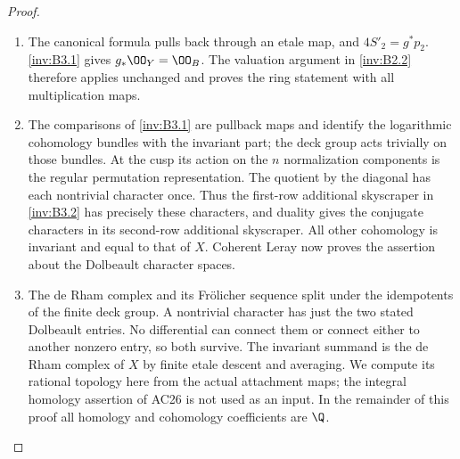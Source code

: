\begin{proof}
\begin{enumerate}[label=\arabic*.,leftmargin=*]
\item The canonical formula pulls back through an etale map, and
$4S'_2=g^*p_2$. \ref{inv:B3.1} gives $g_*\OO_Y=\OO_B$.
The valuation argument in \ref{inv:B2.2} therefore applies unchanged and proves
the ring statement with all multiplication maps.

\item The comparisons of \ref{inv:B3.1} are pullback maps and identify the logarithmic
cohomology bundles with the invariant part; the deck group acts
trivially on those bundles. At the cusp its action on the $n$
normalization components is the regular permutation representation.
The quotient by the diagonal has each nontrivial character once.
Thus the first-row additional skyscraper in \ref{inv:B3.2} has precisely these
characters, and duality gives the conjugate characters in its
second-row additional skyscraper. All other cohomology is invariant
and equal to that of $X$. Coherent Leray now proves the assertion
about the Dolbeault character spaces.

\item The de Rham complex and its Fr\"olicher sequence split under the
idempotents of the finite deck group. A nontrivial character has just
the two stated Dolbeault entries. No differential can connect them
or connect either to another nonzero entry, so both survive.
The invariant summand is the de Rham complex of $X$ by finite
etale descent and averaging. We compute its rational topology here
from the actual attachment maps; the integral homology assertion
of AC26 is not used as an input. In the remainder of this proof
all homology and cohomology coefficients are $\Q$.


\end{enumerate}
\end{proof}
